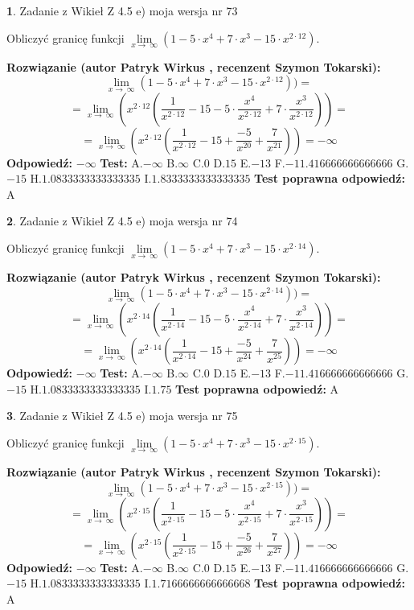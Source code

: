 \documentclass[12pt, a4paper]{article}
\theoremstyle{definition} %
\newtheorem{zad}{}
\newcommand{\zadStart}[1]{\begin{zad}#1\newline}
\newcommand{\zadStop}{\end{zad}}
\newcommand{\rozwStart}[2]{\noindent \textbf{Rozwiązanie (autor #1 , recenzent #2): }\newline}
\newcommand{\rozwStop}{\newline}
\newcommand{\odpStart}{\noindent \textbf{Odpowiedź:}\newline}
\newcommand{\odpStop}{\newline}
\newcommand{\testStart}{\noindent \textbf{Test:}\newline}
\newcommand{\testStop}{\newline}
\newcommand{\kluczStart}{\noindent \textbf{Test poprawna odpowiedź:}\newline}
\newcommand{\kluczStop}{\newline}
\begin{document}
\zadStart{Zadanie z Wikieł Z 4.5 e) moja wersja nr 73}


Obliczyć granicę funkcji  $\lim\limits_{x\to\ \infty}(1 - 5 \cdot x^{4}+7 \cdot x^{3}- 15 \cdot x^{2\cdot12})$.
\zadStop
\rozwStart{Patryk Wirkus}{Szymon Tokarski}
$$\lim\limits_{x\to\ \infty}(1 - 5 \cdot x^{4}+7 \cdot x^{3}- 15 \cdot x^{2\cdot12}))=$$
$$=\lim\limits_{x\to\ \infty}(x^{2\cdot12}(\frac{1}{x^{2\cdot12}}-15 -5 \cdot \frac{x^{4}}{x^{2\cdot12}}+7 \cdot \frac{x^{3}}{x^{2\cdot12}}))=$$
$$=\lim\limits_{x\to\ \infty}(x^{2\cdot12}(\frac{1}{x^{2\cdot12}}-15 + \frac{-5}{x^{20}}+ \frac{7}{x^{21}}))=-\infty$$
\rozwStop
\odpStart
$-\infty$
\odpStop
\testStart
A.$-\infty$ B.$\infty$ C.$0$ D.$15$ E.$-13$
F.$-11.416666666666666$ G.$-15$
H.$1.0833333333333335$
I.$1.8333333333333335$
\testStop
\kluczStart
A
\kluczStop



\zadStart{Zadanie z Wikieł Z 4.5 e) moja wersja nr 74}


Obliczyć granicę funkcji  $\lim\limits_{x\to\ \infty}(1 - 5 \cdot x^{4}+7 \cdot x^{3}- 15 \cdot x^{2\cdot14})$.
\zadStop
\rozwStart{Patryk Wirkus}{Szymon Tokarski}
$$\lim\limits_{x\to\ \infty}(1 - 5 \cdot x^{4}+7 \cdot x^{3}- 15 \cdot x^{2\cdot14}))=$$
$$=\lim\limits_{x\to\ \infty}(x^{2\cdot14}(\frac{1}{x^{2\cdot14}}-15 -5 \cdot \frac{x^{4}}{x^{2\cdot14}}+7 \cdot \frac{x^{3}}{x^{2\cdot14}}))=$$
$$=\lim\limits_{x\to\ \infty}(x^{2\cdot14}(\frac{1}{x^{2\cdot14}}-15 + \frac{-5}{x^{24}}+ \frac{7}{x^{25}}))=-\infty$$
\rozwStop
\odpStart
$-\infty$
\odpStop
\testStart
A.$-\infty$ B.$\infty$ C.$0$ D.$15$ E.$-13$
F.$-11.416666666666666$ G.$-15$
H.$1.0833333333333335$
I.$1.75$
\testStop
\kluczStart
A
\kluczStop



\zadStart{Zadanie z Wikieł Z 4.5 e) moja wersja nr 75}


Obliczyć granicę funkcji  $\lim\limits_{x\to\ \infty}(1 - 5 \cdot x^{4}+7 \cdot x^{3}- 15 \cdot x^{2\cdot15})$.
\zadStop
\rozwStart{Patryk Wirkus}{Szymon Tokarski}
$$\lim\limits_{x\to\ \infty}(1 - 5 \cdot x^{4}+7 \cdot x^{3}- 15 \cdot x^{2\cdot15}))=$$
$$=\lim\limits_{x\to\ \infty}(x^{2\cdot15}(\frac{1}{x^{2\cdot15}}-15 -5 \cdot \frac{x^{4}}{x^{2\cdot15}}+7 \cdot \frac{x^{3}}{x^{2\cdot15}}))=$$
$$=\lim\limits_{x\to\ \infty}(x^{2\cdot15}(\frac{1}{x^{2\cdot15}}-15 + \frac{-5}{x^{26}}+ \frac{7}{x^{27}}))=-\infty$$
\rozwStop
\odpStart
$-\infty$
\odpStop
\testStart
A.$-\infty$ B.$\infty$ C.$0$ D.$15$ E.$-13$
F.$-11.416666666666666$ G.$-15$
H.$1.0833333333333335$
I.$1.7166666666666668$
\testStop
\kluczStart
A
\kluczStop
\end{document}
